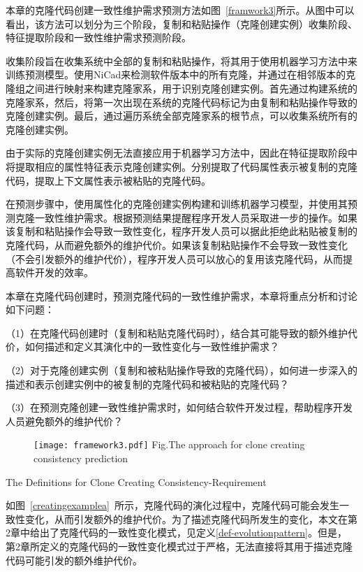 本章的克隆代码创建一致性维护需求预测方法如图~\ref{framwork3}所示。从图中可以看出，该方法可以划分为三个阶段，复制和粘贴操作（克隆创建实例）收集阶段、特征提取阶段和一致性维护需求预测阶段。

收集阶段旨在收集系统中全部的复制和粘贴操作，将其用于使用机器学习方法中来训练预测模型。使用NiCad来检测软件版本中的所有克隆，并通过在相邻版本的克隆组之间进行映射来构建克隆家系，用于识别克隆创建实例。首先通过构建系统的克隆家系，然后，将第一次出现在系统的克隆代码标记为由复制和粘贴操作导致的克隆创建实例。最后，通过遍历系统全部克隆家系的根节点，可以收集系统所有的克隆创建实例。

由于实际的克隆创建实例无法直接应用于机器学习方法中，因此在特征提取阶段中将提取相应的属性特征表示克隆创建实例。分别提取了代码属性表示被复制的克隆代码，提取上下文属性表示被粘贴的克隆代码。

在预测步骤中，使用属性化的克隆创建实例构建和训练机器学习模型，并使用其预测克隆一致性维护需求。根据预测结果提醒程序开发人员采取进一步的操作。如果该复制和粘贴操作会导致一致性变化，程序开发人员可以据此拒绝此粘贴被复制的克隆代码，从而避免额外的维护代价。如果该复制粘贴操作不会导致一致性变化（不会引发额外的维护代价），程序开发人员可以放心的复用该克隆代码，从而提高软件开发的效率。

本章在克隆代码创建时，预测克隆代码的一致性维护需求，本章将重点分析和讨论如下问题：

（1）在克隆代码创建时（复制和粘贴克隆代码时），结合其可能导致的额外维护代价，如何描述和定义其演化中的一致性变化与一致性维护需求？

（2）对于克隆创建实例（复制和被粘贴操作导致的克隆代码），如何进一步深入的描述和表示创建实例中的被复制的克隆代码和被粘贴的克隆代码？

（3）在预测克隆创建一致性维护需求时，如何结合软件开发过程，帮助程序开发人员避免额外的维护代价？

\begin{figure}[htbp]
\centering
\texttt{[image: framework3.pdf]}
{Fig.$\!$}{The approach for clone creating consistency prediction}
\vspace{-1em}
\end{figure}


{The Definitions for Clone Creating Consistency-Requirement}

如图~\ref{creatingexamplea}~所示，克隆代码的演化过程中，克隆代码可能会发生一致性变化，从而引发额外的维护代价。为了描述克隆代码所发生的变化，本文在第2章中给出了克隆代码的一致性变化模式，见定义\ref{def-evolutionpattern}。但是，
第2章所定义的克隆代码的一致性变化模式过于严格，无法直接将其用于描述克隆代码可能引发的额外维护代价。

